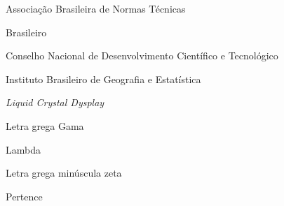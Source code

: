 \documentclass[
	12pt,				%
	oneside,          %
	a4paper,			%
	chapter=TITLE,		%
	section=TITLE,		%
	subsection=TITLE,	%
	english,			%
	brazil			%
	,sumario=tradicional
	]{abntex2-uff}
\begin{document}
\frenchspacing 


\imprimircapa

\imprimirfolhaderosto










%



\listoffigures*
\cleardoublepage


\listoftables*
\cleardoublepage  %

\begin{siglas}
  \item[ABNT] Associação Brasileira de Normas Técnicas
  \item[Bras.] Brasileiro
  \item[CNPq] Conselho Nacional de Desenvolvimento Científico e Tecnológico
  \item[IBGE] Instituto Brasileiro de Geografia e Estatística
  \item[LCD] \textit{Liquid Crystal Dysplay}
\end{siglas}

\begin{simbolos}
  \item[$ \Gamma $] Letra grega Gama
  \item[$ \Lambda $] Lambda
  \item[$ \zeta $] Letra grega minúscula zeta
  \item[$ \in $] Pertence
\end{simbolos}
\end{document}
